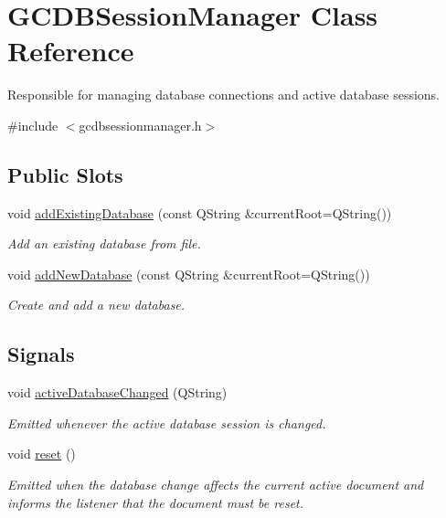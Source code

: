 \hypertarget{class_g_c_d_b_session_manager}{\section{\-G\-C\-D\-B\-Session\-Manager \-Class \-Reference}
\label{class_g_c_d_b_session_manager}
}


\-Responsible for managing database connections and active database sessions.  




{\ttfamily \#include $<$gcdbsessionmanager.\-h$>$}

\subsection*{\-Public \-Slots}
\begin{DoxyCompactItemize}
\item 
void \hyperlink{class_g_c_d_b_session_manager_a52f3407b7ad5cac7c8c422d2528b28fc}{add\-Existing\-Database} (const \-Q\-String \&current\-Root=\-Q\-String())
\begin{DoxyCompactList}\small\item\em \-Add an existing database from file. \end{DoxyCompactList}\item 
void \hyperlink{class_g_c_d_b_session_manager_ad029ca4ec8ffff788a281f1b3f3eee71}{add\-New\-Database} (const \-Q\-String \&current\-Root=\-Q\-String())
\begin{DoxyCompactList}\small\item\em \-Create and add a new database. \end{DoxyCompactList}\end{DoxyCompactItemize}
\subsection*{\-Signals}
\begin{DoxyCompactItemize}
\item 
void \hyperlink{class_g_c_d_b_session_manager_a47338631e494645f867544a719825311}{active\-Database\-Changed} (\-Q\-String)
\begin{DoxyCompactList}\small\item\em \-Emitted whenever the active database session is changed. \end{DoxyCompactList}\item 
void \hyperlink{class_g_c_d_b_session_manager_add2dc0347405ffb60c4ba057009ead46}{reset} ()
\begin{DoxyCompactList}\small\item\em \-Emitted when the database change affects the current active document and informs the listener that the document must be reset. \end{DoxyCompactList}\end{DoxyCompactItemize}
